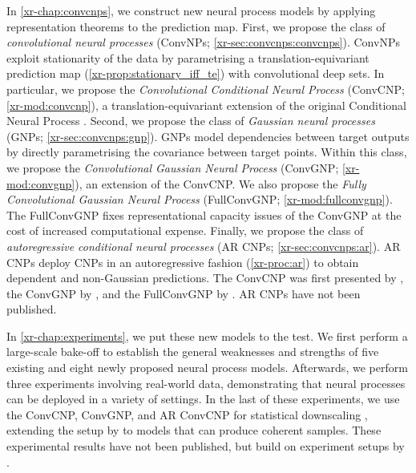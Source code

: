 \documentclass[12pt, twoside]{report}
\newcommand{\xrprefix}[1]{xr-#1}
\begin{document}
In \cref{\xrprefix{chap:convcnps}},
we construct new neural process models by applying representation theorems to the prediction map.
First, we propose the class of \emph{convolutional neural processes} (ConvNPs; \cref{\xrprefix{sec:convcnps:convcnps}}).
ConvNPs exploit stationarity of the data by parametrising a translation-equivariant prediction map (\cref{\xrprefix{prop:stationary_iff_te}}) with convolutional deep sets.
In particular, 
we propose the \emph{Convolutional Conditional Neural Process} (ConvCNP; \cref{\xrprefix{mod:convcnp}}),
a translation-equivariant extension of the original Conditional Neural Process \parencite[CNP;][]{Garnelo:2018:Conditional_Neural_Processes}.
Second, we propose the class of \emph{Gaussian neural processes} (GNPs; \cref{\xrprefix{sec:convcnps:gnp}}).
GNPs model dependencies between target outputs by directly parametrising the covariance between target points.
Within this class, we propose the \emph{Convolutional Gaussian Neural Process} (ConvGNP; \cref{\xrprefix{mod:convgnp}}), an extension of the ConvCNP.
We also propose the \emph{Fully Convolutional Gaussian Neural Process} (FullConvGNP; \cref{\xrprefix{mod:fullconvgnp}}).
The FullConvGNP fixes representational capacity issues of the ConvGNP at the cost of increased computational expense.
Finally, we propose the class of \emph{autoregressive conditional neural processes} (AR CNPs; \cref{\xrprefix{sec:convcnps:ar}}).
AR CNPs deploy CNPs in an autoregressive fashion (\cref{\xrprefix{proc:ar}}) to obtain dependent and non-Gaussian predictions.
The ConvCNP was first presented by \textcite{Gordon:2020:Convolutional_Conditional_Neural_Processes},
the ConvGNP by \textcite{Markou:2022:Practical_Conditional_Neural_Processes_for_Tractable},
and the FullConvGNP by \textcite{Bruinsma:2021:The_Gaussian_Neural_Process}.
AR CNPs have not been published.

In \cref{\xrprefix{chap:experiments}}, we put these new models to the test.
We first perform a large-scale bake-off to establish the general weaknesses and strengths of five existing and eight newly proposed neural process models.
Afterwards, we perform three experiments involving real-world data, demonstrating that neural processes can be deployed in a variety of settings.
In the last of these experiments, we use the ConvCNP, ConvGNP, and AR ConvCNP for statistical downscaling \parencite{Maraun:2018:Statistical_Downscaling_and_Bias_Correction}, extending the setup by \textcite{Vaughan:2022:Convolutional_Conditional_Neural_Processes_for} to models that can produce coherent samples.
These experimental results have not been published,
but build on experiment setups by \textcite{Gordon:2020:Convolutional_Conditional_Neural_Processes,Foong:2020:Meta-Learning_Stationary_Stochastic_Process_Prediction,Bruinsma:2021:The_Gaussian_Neural_Process,Markou:2022:Practical_Conditional_Neural_Processes_for_Tractable}.
\end{document}
